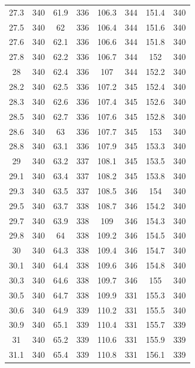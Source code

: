 \documentclass[12pt]{ctexart}
\numberwithin{equation}{section}
\begin{document}
\begin{longtable}{cc|cc|cc|cc}
27.3  &  340  &  61.9  &  336  &  106.3  &  344  &  151.4  &  340  \\
27.5  &  340  &  62  &  336  &  106.4  &  344  &  151.6  &  340  \\
27.6  &  340  &  62.1  &  336  &  106.6  &  344  &  151.8  &  340  \\
27.8  &  340  &  62.2  &  336  &  106.7  &  344  &  152  &  340  \\
28  &  340  &  62.4  &  336  &  107  &  344  &  152.2  &  340  \\
28.2  &  340  &  62.5  &  336  &  107.2  &  345  &  152.4  &  340  \\
28.3  &  340  &  62.6  &  336  &  107.4  &  345  &  152.6  &  340  \\
28.5  &  340  &  62.7  &  336  &  107.6  &  345  &  152.8  &  340  \\
28.6  &  340  &  63  &  336  &  107.7  &  345  &  153  &  340  \\
28.8  &  340  &  63.1  &  336  &  107.9  &  345  &  153.3  &  340  \\
29  &  340  &  63.2  &  337  &  108.1  &  345  &  153.5  &  340  \\
29.1  &  340  &  63.4  &  337  &  108.2  &  345  &  153.8  &  340  \\
29.3  &  340  &  63.5  &  337  &  108.5  &  346  &  154  &  340  \\
29.5  &  340  &  63.7  &  338  &  108.7  &  346  &  154.2  &  340  \\
29.7  &  340  &  63.9  &  338  &  109  &  346  &  154.3  &  340  \\
29.8  &  340  &  64  &  338  &  109.2  &  346  &  154.5  &  340  \\
30  &  340  &  64.3  &  338  &  109.4  &  346  &  154.7  &  340  \\
30.1  &  340  &  64.4  &  338  &  109.6  &  346  &  154.8  &  340  \\
30.3  &  340  &  64.6  &  338  &  109.7  &  346  &  155  &  340  \\
30.5  &  340  &  64.7  &  338  &  109.9  &  331  &  155.3  &  340  \\
30.6  &  340  &  64.9  &  339  &  110.2  &  331  &  155.5  &  340  \\
30.9  &  340  &  65.1  &  339  &  110.4  &  331  &  155.7  &  339  \\
31  &  340  &  65.2  &  339  &  110.6  &  331  &  155.9  &  339  \\
31.1  &  340  &  65.4  &  339  &  110.8  &  331  &  156.1  &  339  \\

\end{longtable}
\end{document}
